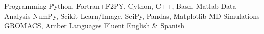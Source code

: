 
\begin{cvskills}
    \cvskill
        {Programming}
        {Python, Fortran+F2PY, Cython, C++, Bash, Matlab}
    \cvskill
        {Data Analysis}
        {NumPy, Scikit-Learn/Image, SciPy, Pandas, Matplotlib}
    \cvskill
        {MD Simulations}
        {GROMACS, Amber}
    \cvskill
        {Languages}
        {Fluent English \& Spanish}
\end{cvskills}
